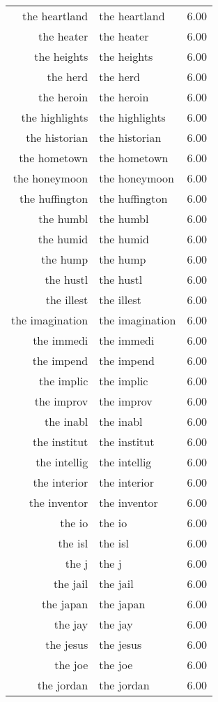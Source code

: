 \begin{table}[ht]
\begin{tabular}{rlr}
  the heartland & the heartland & 6.00 \\ 
  the heater & the heater & 6.00 \\ 
  the heights & the heights & 6.00 \\ 
  the herd & the herd & 6.00 \\ 
  the heroin & the heroin & 6.00 \\ 
  the highlights & the highlights & 6.00 \\ 
  the historian & the historian & 6.00 \\ 
  the hometown & the hometown & 6.00 \\ 
  the honeymoon & the honeymoon & 6.00 \\ 
  the huffington & the huffington & 6.00 \\ 
  the humbl & the humbl & 6.00 \\ 
  the humid & the humid & 6.00 \\ 
  the hump & the hump & 6.00 \\ 
  the hustl & the hustl & 6.00 \\ 
  the illest & the illest & 6.00 \\ 
  the imagination & the imagination & 6.00 \\ 
  the immedi & the immedi & 6.00 \\ 
  the impend & the impend & 6.00 \\ 
  the implic & the implic & 6.00 \\ 
  the improv & the improv & 6.00 \\ 
  the inabl & the inabl & 6.00 \\ 
  the institut & the institut & 6.00 \\ 
  the intellig & the intellig & 6.00 \\ 
  the interior & the interior & 6.00 \\ 
  the inventor & the inventor & 6.00 \\ 
  the io & the io & 6.00 \\ 
  the isl & the isl & 6.00 \\ 
  the j & the j & 6.00 \\ 
  the jail & the jail & 6.00 \\ 
  the japan & the japan & 6.00 \\ 
  the jay & the jay & 6.00 \\ 
  the jesus & the jesus & 6.00 \\ 
  the joe & the joe & 6.00 \\ 
  the jordan & the jordan & 6.00 \\ 

\end{tabular}
\end{table}
